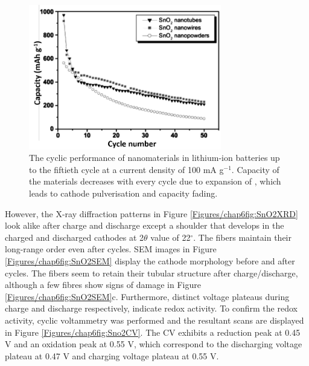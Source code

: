 \begin{figure}[th!]
\centering
\includegraphics[width=0.75\textwidth]{Figures/chap6fig/sno2pap.pdf}
\caption{The cyclic performance of  nanomaterials in lithium-ion batteries up to the fiftieth cycle at a current density of 100 mA g$^{-1}$. Capacity of the materials decreases with every cycle due to expansion of , which leads to cathode pulverisation and capacity fading.}
\label{Figures/chap6fig:sno2pap}
\end{figure}
However, the X-ray diffraction patterns in Figure \ref{Figures/chap6fig:SnO2XRD} look alike after charge and discharge except a shoulder that develops in the charged and discharged cathodes at 2$\theta$ value of 22$^{\circ}$. The fibers maintain their long-range order even after cycles. SEM images in Figure \ref{Figures/chap6fig:SnO2SEM} display the cathode morphology before and after cycles. The fibers seem to retain their tubular structure after charge/discharge, although a few fibres show signs of damage in Figure \ref{Figures/chap6fig:SnO2SEM}c. Furthermore, distinct voltage plateaus during charge and discharge respectively, indicate redox activity. To confirm the redox activity, cyclic voltammetry was performed and the resultant scans are displayed in Figure \ref{Figures/chap6fig:Sno2CV}. The CV exhibits a reduction peak at 0.45 V and an oxidation peak at 0.55 V, which correspond to the discharging voltage plateau at 0.47 V and charging voltage plateau at 0.55 V. 

